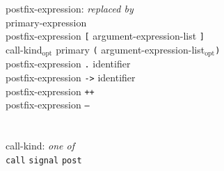 \documentclass[11pt,letterpaper]{article}
\newcommand{\kw}[1]{{\tt #1}}
\newcommand{\opt}{$_{\mbox{opt}}$\xspace}
\begin{document}
\begin{tabbing}
postfix-expression: \emph{replaced by}\\
\>	primary-expression\\
\>	postfix-expression \kw{[} argument-expression-list \kw{]}\\
\>	call-kind\opt primary \kw{(} argument-expression-list\opt \kw{)}\\
\>	postfix-expression \kw{.} identifier\\
\>	postfix-expression \kw{->} identifier\\
\>	postfix-expression \kw{++}\\
\>	postfix-expression \kw{--}\\
\\\\
call-kind: \emph{one of}\\
\>	\kw{call} \kw{signal} \kw{post}
\end{tabbing} \rm
\end{document}
